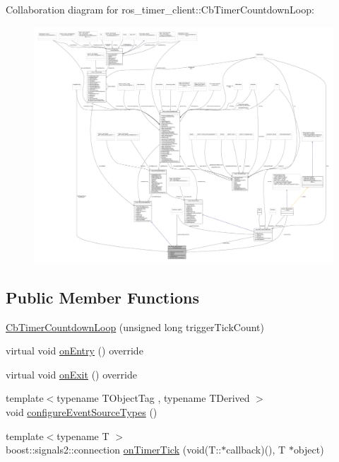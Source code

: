 Collaboration diagram for ros\+\_\+timer\+\_\+client\+:\+:Cb\+Timer\+Countdown\+Loop\+:
\nopagebreak
\begin{figure}[H]
\begin{center}
\leavevmode
\includegraphics[width=350pt]{classros__timer__client_1_1CbTimerCountdownLoop__coll__graph}
\end{center}
\end{figure}
\subsection*{Public Member Functions}
\begin{DoxyCompactItemize}
\item 
\hyperlink{classros__timer__client_1_1CbTimerCountdownLoop_aadceff62d42bac73682da8d729fe9c36}{Cb\+Timer\+Countdown\+Loop} (unsigned long trigger\+Tick\+Count)
\item 
virtual void \hyperlink{classros__timer__client_1_1CbTimerCountdownLoop_ae547ef69c9ce8029b0f5f27120155c9f}{on\+Entry} () override
\item 
virtual void \hyperlink{classros__timer__client_1_1CbTimerCountdownLoop_aa671fabe23945e85e65cee7a3c1e761b}{on\+Exit} () override
\item 
{\footnotesize template$<$typename T\+Object\+Tag , typename T\+Derived $>$ }\\void \hyperlink{classros__timer__client_1_1CbTimerCountdownLoop_a8e0193f4b75805b2b15fe6e63c631670}{configure\+Event\+Source\+Types} ()
\item 
{\footnotesize template$<$typename T $>$ }\\boost\+::signals2\+::connection \hyperlink{classros__timer__client_1_1CbTimerCountdownLoop_a7ebf87093607e9497f18eb0ded9fc1f9}{on\+Timer\+Tick} (void(T\+::$\ast$callback)(), T $\ast$object)
\end{DoxyCompactItemize}
